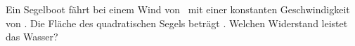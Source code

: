 Ein Segelboot fährt bei einem Wind von \vWdO\ mit einer konstanten Geschwindigkeit von \vBtO. Die Fläche des quadratischen Segels beträgt \ASeO. Welchen Widerstand leistet das Wasser?
